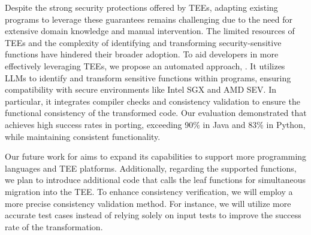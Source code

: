 Despite the strong security protections offered by TEEs, adapting existing programs to leverage these guarantees remains challenging due to the need for extensive domain knowledge and manual intervention. The limited resources of TEEs and the complexity of identifying and transforming security-sensitive functions have hindered their broader adoption. To aid developers in more effectively leveraging TEEs, we propose an automated approach, \system. It utilizes LLMs to identify and transform sensitive functions within programs, ensuring compatibility with secure environments like Intel SGX and AMD SEV. In particular, it integrates compiler checks and consistency validation to ensure the functional consistency of the transformed code. Our evaluation demonstrated that \system achieves high success rates in porting, exceeding 90\% in Java and 83\% in Python, while maintaining consistent functionality.

Our future work for \system aims to expand its capabilities to support more programming languages and TEE platforms. Additionally, regarding the supported functions, we plan to introduce additional code that calls the leaf functions for simultaneous migration into the TEE. To enhance consistency verification, we will employ a more precise consistency validation method. For instance, we will utilize more accurate test cases instead of relying solely on input tests to improve the success rate of the transformation.

